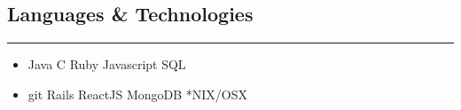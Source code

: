 \documentclass[11pt,letterpaper]{article}
\begin{document}
\vspace{-.6em}
\subsection*{Languages \& Technologies}
\vspace{-0.4em}
\hrule

\begin{itemize}[leftmargin=*]
\parskip=0.1em


\item  Java  C  Ruby  Javascript  SQL 
\item  git  Rails  ReactJS  MongoDB  *NIX/OSX 
\end{itemize}
\end{document}
